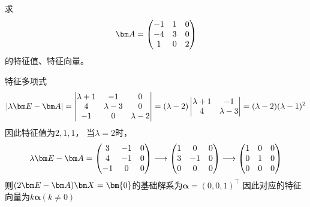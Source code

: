\begin{example}
    求
    \[
        \mat{A} =
        \begin{pmatrix}
            -1 & 1 & 0 \\
            -4 & 3 & 0 \\
            1  & 0 & 2
        \end{pmatrix}
    \]
    的特征值、特征向量。
\end{example}
\begin{solution}
    特征多项式
    \[
        |\lambda \mat{E} - \mat{A}|
        =
        \begin{vmatrix}
            \lambda+1 & -1        & 0         \\
            4         & \lambda-3 & 0         \\
            -1        & 0         & \lambda-2
        \end{vmatrix}
        =(\lambda-2)
        \begin{vmatrix}
            \lambda+1 & -1        \\
            4         & \lambda-3
        \end{vmatrix}
        = (\lambda-2)(\lambda-1)^2
    \]
    因此特征值为$2,1,1$，
    当$\lambda = 2$时，
    \[
        \lambda \mat{E} - \mat{A} =
        \begin{pmatrix}
            3  & -1 & 0 \\
            4  & -1 & 0 \\
            -1 & 0  & 0
        \end{pmatrix}
        \longrightarrow
        \begin{pmatrix}
            1 & 0  & 0 \\
            3 & -1 & 0 \\
            0 & 0  & 0
        \end{pmatrix}
        \longrightarrow
        \begin{pmatrix}
            1 & 0 & 0 \\
            0 & 1 & 0 \\
            0 & 0 & 0
        \end{pmatrix}
    \]
    则$(2\mat{E}-\mat{A})\mat{X}=\bm{0}$的基础解系为$\bm{\alpha} = (0,0,1)^\intercal$
    因此对应的特征向量为$k\bm{\alpha} (k\neq 0)$


\end{solution}
